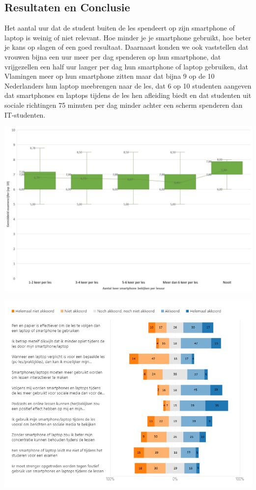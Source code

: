 \documentclass[a0,portrait]{a0poster}
\begin{document}
\begin{multicols}{2}
\section*{Resultaten en Conclusie}
\color{black}
Het aantal uur dat de student buiten de les
spendeert op zijn smartphone of laptop is weinig of niet relevant. Hoe minder je je
smartphone gebruikt, hoe beter je kans op slagen of een goed resultaat. Daarnaast konden
we ook vaststellen dat vrouwen bijna een uur meer per dag spenderen op hun smartphone,
dat vrijgezellen een half uur langer per dag hun smartphone of laptop gebruiken, dat
Vlamingen meer op hun smartphone zitten maar dat bijna 9 op de 10 Nederlanders hun
laptop meebrengen naar de les, dat 6 op 10 studenten aangeven dat smartphones en laptops
tijdens de les hen afleiding biedt en dat studenten uit sociale richtingen 75 minuten per dag minder
achter een scherm spenderen dan IT-studenten.
\begin{center}\vspace{1cm}
	\includegraphics[scale=0.8]{Boxplot1.jpg}
\end{center}\vspace{1cm}
\begin{center}\vspace{1cm}
	\includegraphics[scale=1.3]{stellingen.png}

\end{center}
\end{multicols}
\end{document}
